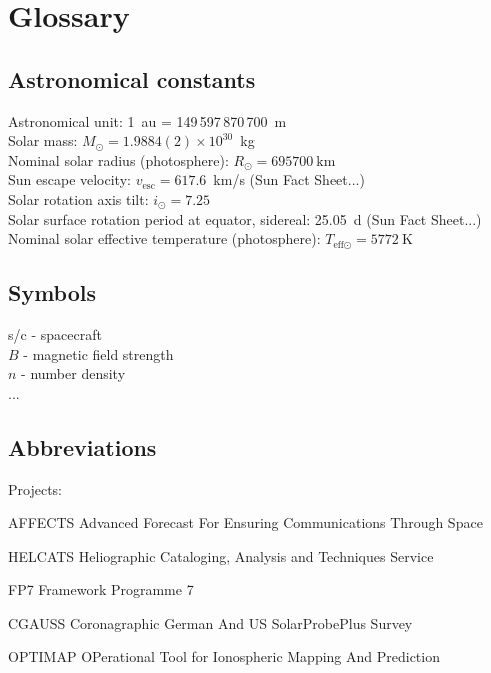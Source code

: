 
\chapter{Glossary}
\label{chap:glossary}

\section{Astronomical constants}
\label{sec:astronomical_constants}

Astronomical unit: 1~au = 149\,597\,870\,700~m \citep{USNO2015}\\ %
Solar mass: $M_\odot = 1.9884(2)\times10^{30}$~kg \citep{USNO2015}\\ %
Nominal solar radius (photosphere): $R_\odot = \SI{695700}{\km}$ \citep{Mamajek2015}\\ %
Sun escape velocity: $v_\text{esc} = 617.6$~km/s (Sun Fact Sheet...)\\
Solar rotation axis tilt: $i_\odot = 7.25$\textdegree{} \citep{USNO2015}\\ %
Solar surface rotation period at equator, sidereal: 25.05~d (Sun Fact Sheet...)\\
Nominal solar effective temperature (photosphere): $T_{\text{eff}\odot} = \SI{5772}{\kelvin}$ \citep{Mamajek2015}\\



\section{Symbols}
\label{sec:symbols}

s/c - spacecraft\\
$B$ - magnetic field strength\\
$n$ - number density\\
...\\


\section{Abbreviations}
\label{sec:abbreviations}

Projects:
\begin{description*}
	\item[AFFECTS] Advanced Forecast For Ensuring Communications Through Space
	\item[HELCATS] Heliographic Cataloging, Analysis and Techniques Service
	\item[FP7] Framework Programme 7
	\item[CGAUSS] Coronagraphic German And US SolarProbePlus Survey
	\item[OPTIMAP] OPerational Tool for Ionospheric Mapping And Prediction
\end{description*}

